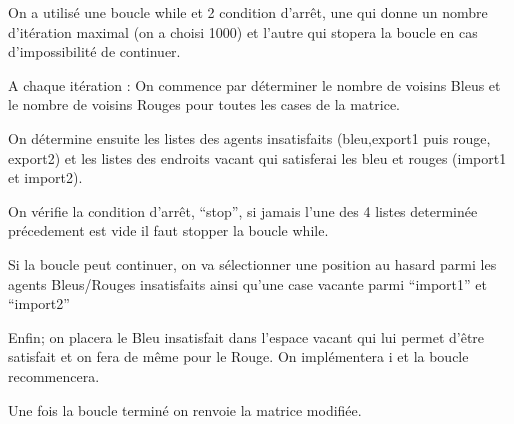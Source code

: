 \documentclass[
]{article}
\begin{document}
On a utilisé une boucle while et 2 condition d'arrêt, une qui donne un
nombre d'itération maximal (on a choisi 1000) et l'autre qui stopera la
boucle en cas d'impossibilité de continuer.

A chaque itération : On commence par déterminer le nombre de voisins
Bleus et le nombre de voisins Rouges pour toutes les cases de la
matrice.

On détermine ensuite les listes des agents insatisfaits (bleu,export1
puis rouge, export2) et les listes des endroits vacant qui satisferai
les bleu et rouges (import1 et import2).

On vérifie la condition d'arrêt, ``stop'', si jamais l'une des 4 listes
determinée précedement est vide il faut stopper la boucle while.

Si la boucle peut continuer, on va sélectionner une position au hasard
parmi les agents Bleus/Rouges insatisfaits ainsi qu'une case vacante
parmi ``import1'' et ``import2''

Enfin; on placera le Bleu insatisfait dans l'espace vacant qui lui
permet d'être satisfait et on fera de même pour le Rouge. On
implémentera i et la boucle recommencera.

Une fois la boucle terminé on renvoie la matrice modifiée.
\end{document}
